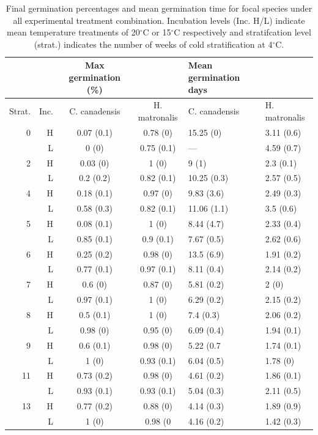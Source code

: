 \documentclass{article}
\begin{document}
\begin{table}[hp]
\centering
\begin{tabular}{|rr|cc|ll|}
   \hline
     & & Max germination (\%) & &
   Mean germination days & \\ 
  \hline
  Strat. & Inc.  & C. canadensis & H. matronalis & C. canadensis & H. matronalis \\ 
  \hline
0 & H & 0.07 (0.1) & 0.78 (0) & 15.25 (0) & 3.11 (0.6) \\ 
  & L & 0 (0) & 0.75 (0.1) & --- & 4.59 (0.7) \\ 
   \hline
 2 & H & 0.03 (0) & 1 (0) & 9 (1) & 2.3 (0.1) \\ 
  & L & 0.2 (0.2) & 0.82 (0.1) & 10.25 (0.3) & 2.57 (0.5) \\ 
   \hline
 4 & H & 0.18 (0.1) & 0.97 (0) & 9.83 (3.6) & 2.49 (0.3) \\ 
 & L & 0.58 (0.3) & 0.82 (0.1) & 11.06 (1.1) & 3.5 (0.6) \\ 
    \hline
    5 & H & 0.08 (0.1) & 1 (0) & 8.44 (4.7) & 2.33 (0.4) \\ 
 & L & 0.85 (0.1) & 0.9 (0.1) & 7.67 (0.5) & 2.62 (0.6) \\ 
   \hline
   6 & H & 0.25 (0.2) & 0.98 (0) & 13.5 (6.9) & 1.91 (0.2) \\ 
  & L & 0.77 (0.1) & 0.97 (0.1) & 8.11 (0.4) & 2.14 (0.2) \\ 
    \hline
    7 & H & 0.6 (0) & 0.87 (0) & 5.81 (0.2) & 2 (0) \\ 
 & L & 0.97 (0.1) & 1 (0) & 6.29 (0.2) & 2.15 (0.2) \\ 
    \hline
    8 & H & 0.5 (0.1) & 1 (0) & 7.4 (0.3) & 2.06 (0.2) \\ 
 & L & 0.98 (0) & 0.95 (0) & 6.09 (0.4) & 1.94 (0.1) \\ 
      \hline
   9 & H & 0.6 (0.1) & 0.98 (0) & 5.22 (0.7 & 1.74 (0.1) \\ 
 & L & 1 (0) & 0.93 (0.1) & 6.04 (0.5) & 1.78 (0) \\ 
      \hline
   11 & H & 0.73 (0.2) & 0.98 (0) & 4.61 (0.2) & 1.86 (0.1) \\ 
 & L & 0.93 (0.1) & 0.93 (0.1) & 5.04 (0.3) & 2.11 (0.5) \\ 
      \hline
   13 & H & 0.77 (0.2) & 0.88 (0) & 4.14 (0.3) & 1.89 (0.9) \\ 
 & L & 1 (0) & 0.98 (0 & 4.16 (0.2) & 1.42 (0.3) \\ 
   \hline
\end{tabular}
\caption{Final germination percentages and mean germination time for focal species under all experimental treatment combination. Incubation levels (Inc. H/L) indicate mean temperature treatments of 20$^\circ$C or 15$^\circ$C respectively and stratifcation level (strat.) indicates the number of weeks of cold stratification at 4$^\circ$C.}
\label{tab:germcomps}
\end{table}
\end{document}
